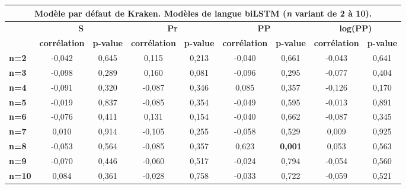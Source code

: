 \documentclass[10pt,twoside]{article}
\begin{document}
\begin{table}
\begin{center}
\begin{scriptsize}
\begin{tabular}{|l|c|c|c|c|c|c|c|c|}
    \end{tabular}
    \begin{tabular}{|l|c|c|c|c|c|c|c|c|}
    \multicolumn{9}{c}{{\footnotesize Modèle par défaut de Kraken. Modèles de langue biLSTM (\textit{n} variant de 2 à 10).}}\\\hline
    \multirow{2}{*}{\textbf{}} & \multicolumn{2}{c|}{\textbf{S}}         & \multicolumn{2}{c|}{\textbf{Pr}}        & \multicolumn{2}{c|}{\textbf{PP}}        & \multicolumn{2}{c|}{\textbf{log(PP)}}   \\ \cline{2-9} 
                               & \textbf{corrélation} & \textbf{p-value} & \textbf{corrélation} & \textbf{p-value} & \textbf{corrélation} & \textbf{p-value} & \textbf{corrélation} & \textbf{p-value} \\ \hline
    \textbf{n=2}  & -0,042 & 0,645 & 0,115  & 0,213 & -0,040 & 0,661          & -0,043 & 0,641 \\ \hline
    \textbf{n=3}  & -0,098 & 0,289 & 0,160  & 0,081 & -0,096 & 0,295          & -0,077 & 0,404 \\ \hline
    \textbf{n=4}  & -0,091 & 0,320 & -0,087 & 0,346 & 0,085  & 0,357          & -0,126 & 0,170 \\ \hline
    \textbf{n=5}  & -0,019 & 0,837 & -0,085 & 0,354 & -0,049 & 0,595          & -0,013 & 0,891 \\ \hline
    \textbf{n=6}  & -0,076 & 0,411 & 0,131  & 0,154 & -0,040 & 0,662          & -0,087 & 0,345 \\ \hline
    \textbf{n=7}  & 0,010  & 0,914 & -0,105 & 0,255 & -0,058 & 0,529          & 0,009  & 0,925 \\ \hline
    \textbf{n=8}  & -0,053 & 0,564 & -0,085 & 0,357 & 0,623  & \textbf{0,001} & 0,053  & 0,563 \\ \hline
    \textbf{n=9}  & -0,070 & 0,446 & -0,060 & 0,517 & -0,024 & 0,794          & -0,054 & 0,560 \\ \hline
    \textbf{n=10} & 0,084  & 0,361 & -0,028 & 0,758 & -0,033 & 0,722          & -0,059 & 0,521 \\ \hline
    




\end{tabular}
\end{scriptsize}
\end{center}
\end{table}
\end{document}
